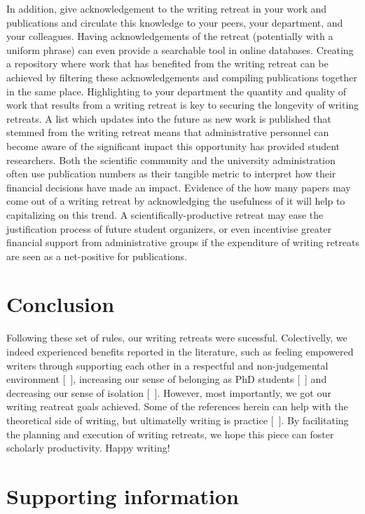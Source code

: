 \documentclass[10pt,letterpaper]{article}
\begin{document}
In addition, give acknowledgement to the writing retreat in your work and publications and circulate this knowledge to your peers, your department, and your colleagues. Having acknowledgements of the retreat (potentially with a uniform phrase) can even provide a searchable tool in online databases. Creating a repository where work that has benefited from the writing retreat can be achieved by filtering these acknowledgements and compiling publications together in the same place. Highlighting to your department the quantity and quality of work that results from a writing retreat is key to securing the longevity of writing retreats. A list which updates into the future as new work is published that stemmed from the writing retreat means that administrative personnel can become aware of the significant impact this opportunity has provided student researchers. Both the scientific community and the university administration often use publication numbers as their tangible metric to interpret how their financial decisions have made an impact. Evidence of the how many papers may come out of a writing retreat by acknowledging the usefulness of it will help to capitalizing on this trend. A scientifically-productive retreat may ease the justification process of future student organizers, or even incentivise greater financial support from administrative groups if the expenditure of writing retreats are seen as a net-positive for publications.

\section*{Conclusion}

Following these set of rules, our writing retreats were sucessful. Colectivelly, we indeed experienced benefits reported in the literature, such as feeling empowered writers through supporting each other in a respectful and non-judgemental environment [~\cite{papen2018}], increasing our sense of belonging as PhD students [~\cite{omeara}] and decreasing our sense of isolation [~\cite{eardley2021}]. However, most importantly, we got our writing reatreat goals achieved. Some of the references herein can help with the theoretical side of writing, but ultimatelly writing is practice [~\cite{peterson2018, grogan2021}]. By facilitating the planning and execution of writing retreats, we hope this piece can foster scholarly productivity. Happy writing!

\section*{Supporting information}
\end{document}
